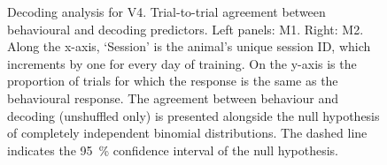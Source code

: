 \begin{figure}[htbp]
    \centering
    \hspace*{\fill}
    \hspace*{\fill}\hspace{.2cm}\hspace*{\fill}
    \hspace*{\fill}
    \caption{%
    Decoding analysis for \ac{V4}.
    Trial-to-trial agreement between behavioural and decoding predictors.
    Left panels: \ac{M1}. Right: \ac{M2}.
	Along the x-axis, `Session' is the animal's unique session ID, which increments by one for every day of training.
    On the y-axis is the proportion of trials for which the response is the same as the behavioural response.
    The agreement between behaviour and decoding (unshuffled only) is presented alongside the null hypothesis of completely independent binomial distributions.
    The dashed line indicates the \SI{95}{\percent} confidence interval of the null hypothesis.
}
    \label{fig:decag_all_v4}
\end{figure}


